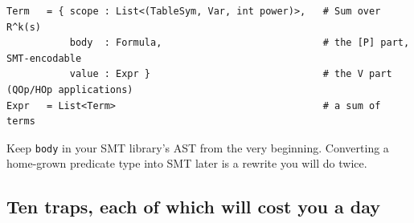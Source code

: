 \begin{lstlisting}[style=pseudo]
Term   = { scope : List<(TableSym, Var, int power)>,   # Sum over R^k(s)
           body  : Formula,                            # the [P] part, SMT-encodable
           value : Expr }                              # the V part (QOp/HOp applications)
Expr   = List<Term>                                    # a sum of terms
\end{lstlisting}

Keep \texttt{body} in your SMT library's AST from the very beginning. Converting a
home-grown predicate type into SMT later is a rewrite you will do twice.

\subsection{Ten traps, each of which will cost you a day}

